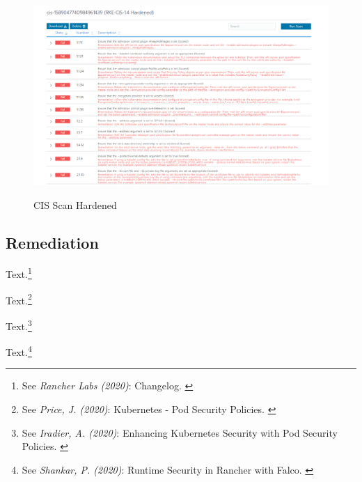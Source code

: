 \begin{figure}[H]
\centering
\caption {CIS Scan Hardened}
\includegraphics[width=\linewidth]{images/cis-scan-detail.png}
\label{fig:cisScanDetails}
\end{figure}

\subsection{Remediation}

Text.\footnote{See \textit{Rancher Labs (2020)}: Changelog. \cite{ChangeLog}}

Text.\footnote{See \textit{Price, J. (2020)}: Kubernetes - Pod Security Policies. \cite{examplePsp}}

Text.\footnote{See \textit{Iradier, A. (2020)}: Enhancing Kubernetes Security with Pod Security Policies. \cite{detailPsp}}

Text.\footnote{See \textit{Shankar, P. (2020)}: Runtime Security in Rancher with Falco. \cite{falcoPsp}}
